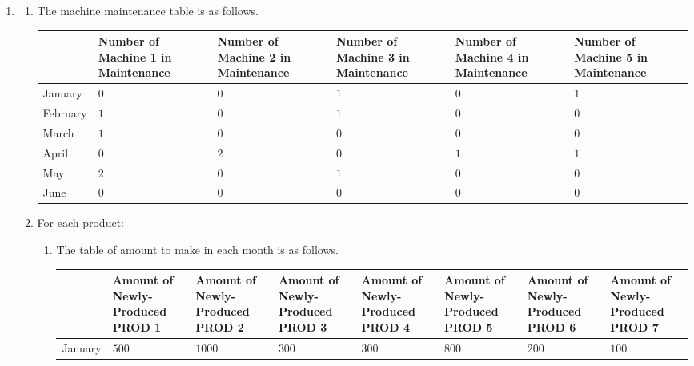 \documentclass[12pt,a4paper]{article}
\makeatletter
\newtheorem*{solution}{Solution}
\theoremstyle{definition}
\renewenvironment{solution}[1][Solution] {\par\pushQED{\qed}\normalfont\topsep6\p@\@plus6\p@\relax\trivlist\item[\hskip\labelsep\bfseries#1\@addpunct{.}]\ignorespaces}{\popQED\endtrivlist\@endpefalse} \makeatother
\makeatother
\begin{document}
\begin{enumerate}
\begin{solution}
\begin{enumerate}
		\begin{enumerate}
			\item
			The machine maintenance table is as follows.
    	\begin{table}[htbp]
    		\scriptsize
    		\centering
    		\renewcommand\arraystretch{1.1}
    		\begin{tabular}{m{} m{}<{\centering} m{}<{\centering} m{}<{\centering} m{}<{\centering} m{}<{\centering}}
    			\hline
    			& \textbf{Number of Machine 1 in Maintenance} & \textbf{Number of Machine 2 in Maintenance} & \textbf{Number of Machine 3 in Maintenance} & \textbf{Number of Machine 4 in Maintenance} & \textbf{Number of Machine 5 in Maintenance} \\\hline
    			January & $0$ & $0$ & $1$ & $0$ & $1$ \\
    			February & $1$ & $0$ & $1$ & $0$ & $0$ \\
    			March & $1$ & $0$ & $0$ & $0$ & $0$ \\
    			April & $0$ & $2$ & $0$ & $1$ & $1$ \\
    			May & $2$ & $0$ & $1$ & $0$ & $0$ \\
    			June & $0$ & $0$ & $0$ & $0$ & $0$ \\
    			\hline
    		\end{tabular}
    	\end{table}  			
			\item
			For each product:
			\begin{enumerate}
				\item
				The table of amount to make in each month is as follows.
    	\begin{table}[htbp]
    		\scriptsize
    		\centering
    		\renewcommand\arraystretch{1.1}
    		\begin{tabular}{m{} m{}<{\centering} m{}<{\centering} m{}<{\centering} m{}<{\centering} m{}<{\centering} m{}<{\centering} m{}<{\centering}}
    			\hline
    			& \textbf{Amount of Newly-Produced PROD 1} & \textbf{Amount of Newly-Produced PROD 2} & \textbf{Amount of Newly-Produced PROD 3} & \textbf{Amount of Newly-Produced PROD 4} & \textbf{Amount of Newly-Produced PROD 5} & \textbf{Amount of Newly-Produced PROD 6} &  \textbf{Amount of Newly-Produced PROD 7} \\\hline
    			January & $500$	& $1000$ & $300$ & $300$ & $800$ & $200$ & $100$ \\

\end{tabular}
\end{table}
\end{enumerate}
\end{enumerate}
\end{enumerate}
\end{solution}
\end{enumerate}
\end{document}
